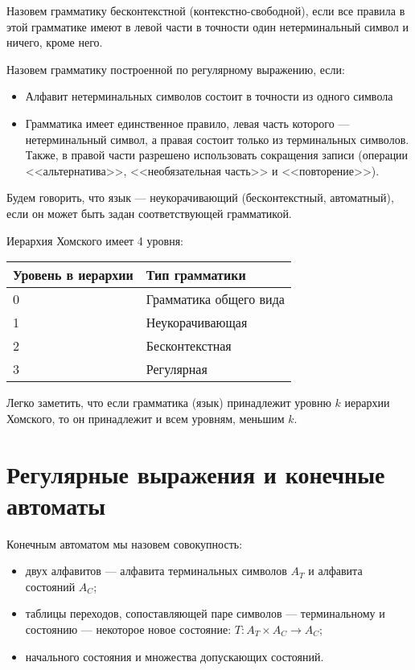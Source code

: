 \documentclass[12pt,a4paper,oneside]{article}
\begin{document}
\begin{definition}
Назовем грамматику бесконтекстной (контекстно-свободной), если все правила в этой
грамматике имеют в левой части в точности один нетерминальный символ и ничего, кроме
него.
\end{definition}

\begin{definition}
Назовем грамматику построенной по регулярному выражению, если:
\begin{itemize}
\item Алфавит нетерминальных символов состоит в точности из одного символа
\item Грамматика имеет единственное правило, левая часть которого --- нетерминальный
символ, а правая состоит только из терминальных символов. Также, в правой части
разрешено использовать сокращения записи (операции <<альтернатива>>, 
<<необязательная часть>> и <<повторение>>).
\end{itemize}
\end{definition}

\begin{definition}
Будем говорить, что язык --- неукорачивающий (бесконтекстный, автоматный), если
он может быть задан соответствующей грамматикой. 
\end{definition}

\begin{definition}Иерархия Хомского имеет 4 уровня:

\vspace{0.3cm}

\begin{tabular}{ll}
Уровень в иерархии&Тип грамматики\\
\hline
0 & Грамматика общего вида\\
1 & Неукорачивающая\\
2 & Бесконтекстная\\
3 & Регулярная
\end{tabular}
\end{definition}

Легко заметить, что если грамматика (язык) принадлежит уровню $k$ иерархии Хомского, 
то он принадлежит и всем уровням, меньшим $k$.

\section{Регулярные выражения и конечные автоматы}

\begin{definition}
Конечным автоматом мы назовем совокупность:
\begin{itemize}
\item двух алфавитов --- алфавита терминальных символов $A_T$ и алфавита состояний $A_C$;
\item таблицы переходов, сопоставляющей паре символов --- терминальному и состоянию --- некоторое
новое состояние: $T: A_T\times A_C \rightarrow A_C$;
\item начального состояния и множества допускающих состояний.
\end{itemize}
\end{definition}
\end{document}
